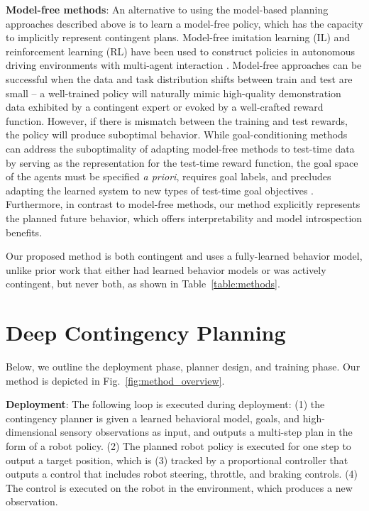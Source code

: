\documentclass[conference]{IEEEtran}
\newcommand{\mypara}[1]{\vspace{1mm}\noindent\textbf{#1}:}
\begin{document}
\mypara{Model-free methods}
An alternative to using the model-based planning approaches described above is to learn a model-free {policy}, which has the capacity to implicitly represent contingent plans. Model-free imitation learning (IL) and reinforcement learning (RL) have been used to construct policies in autonomous driving environments with multi-agent interaction  \citep{dosovitskiy_carla_2017,chen2019deep,codevilla2019exploring,tang2019selfplay,palanisamy2019macad,hawke2020urban}. Model-free approaches can be successful when the data and task distribution shifts between train and test are small -- a well-trained policy will naturally mimic high-quality demonstration data exhibited by a contingent expert or evoked by a well-crafted reward function. However, if there is mismatch between the training and test rewards, the policy will produce suboptimal behavior. While goal-conditioning methods can address the suboptimality of adapting model-free methods to test-time data by serving as the representation for the test-time reward function, the goal space of the agents must be specified \emph{a priori}, requires goal labels, and precludes adapting the learned system to new types of test-time goal objectives \citep{codevilla2019exploring,hawke2020urban}.
Furthermore, in contrast to model-free methods, our method explicitly represents the planned future behavior, which offers interpretability and model introspection benefits. 

Our proposed method is both contingent and uses a fully-learned behavior model, unlike prior work that either had learned behavior models or was actively contingent, but never both, as shown in Table~\ref{table:methods}.

\vspace{-.35em}
\section{Deep Contingency Planning}
\vspace{-.25em}

Below, we outline the deployment phase, planner design, and training phase. Our method is depicted in Fig.~\ref{fig:method_overview}. 

\mypara{Deployment} The following loop is executed during deployment: (1) the contingency planner is given a learned behavioral model, goals, and high-dimensional sensory observations as input, and outputs a multi-step plan in the form of a robot policy. (2) The planned robot policy is executed for one step to output a target position, which is (3) tracked by a proportional controller that outputs a control that includes robot steering, throttle, and braking controls. (4) The control is executed on the robot in the environment, which produces a new observation.
\end{document}
